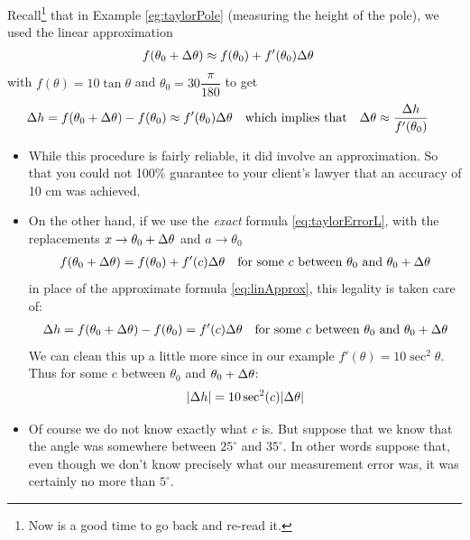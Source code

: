 \begin{eg}[More on $e^x$]
\end{eg}

\begin{eg}
Recall\footnote{Now is a good time to go back and re-read it.} that in Example
\ref{eg:taylorPole} (measuring the height of the pole), we
used the linear approximation
\begin{align*}%
f(\theta_0+\De\theta)&\approx f(\theta_0)+f'(\theta_0)\De\theta
\end{align*}
with $f(\theta)=10\tan\theta$ and $\theta_0=30\dfrac{\pi}{180}$ to get
\begin{align*}
\Delta h &=f(\theta_0+\Delta\theta)-f(\theta_0)\approx f'(\theta_0)\Delta\theta
  & \text{which implies that} &
  &\Delta\theta &\approx \frac{\Delta h}{f'(\theta_0)}
\end{align*}
\begin{itemize}
\item While this procedure is fairly reliable, it did involve an approximation.
So that you could not 100\% guarantee to your client's lawyer  that an accuracy of 10 cm
was achieved.
\item On the other hand, if we use the \emph{exact} formula \eqref{eq:taylorErrorL}, with
the replacements
$x\rightarrow \theta_0+\Delta\theta$ and $a\rightarrow\theta_0$
\begin{align*}
f(\theta_0+\Delta\theta)&=f(\theta_0)+f'(c)\Delta\theta
& \text{for some $c$ between $\theta_0$ and $\theta_0+\Delta\theta$}
\end{align*}
in place of the approximate formula \eqref{eq:linApprox}, this legality
is taken care of:
\begin{align*}
\Delta h &=f(\theta_0+\Delta\theta)-f(\theta_0) =f'(c)\Delta\theta
& \text{for some $c$ between $\theta_0$ and $\theta_0+\Delta\theta$}
\end{align*}
We can clean this up a little more since in our example $f'(\theta) = 10\sec^2\theta$.
Thus for some $c$ between $\theta_0$ and $\theta_0 + \Delta\theta$:
\begin{align*}
|\Delta h| = 10 \sec^2(c) |\Delta \theta|
\end{align*}



\item Of course we do not know exactly what $c$ is. But suppose that we know
that the angle was somewhere between $25^\circ$ and $35^\circ$. In other
words suppose that, even though we don't know precisely
what our measurement error was, it was certainly no more than $5^\circ$.


\end{itemize}
\end{eg}
